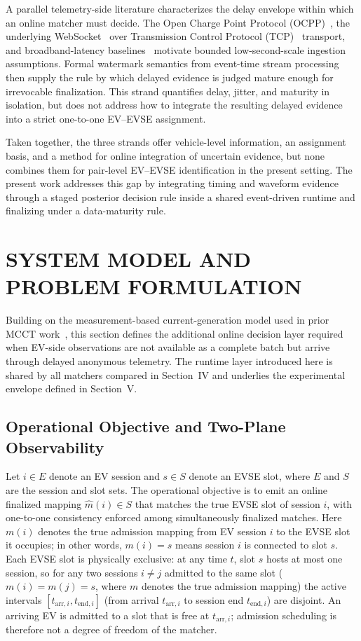 \documentclass{ieeeaccess}
\begin{document}
    A parallel telemetry-side literature characterizes the delay envelope within which an online matcher must decide.
    The Open Charge Point Protocol (OCPP)~\cite{b22}, the underlying WebSocket~\cite{b23} over Transmission Control Protocol (TCP)~\cite{b24} transport, and broadband-latency baselines~\cite{b25} motivate bounded low-second-scale ingestion assumptions.
    Formal watermark semantics from event-time stream processing~\cite{b26} then supply the rule by which delayed evidence is judged mature enough for irrevocable finalization.
    This strand quantifies delay, jitter, and maturity in isolation, but does not address how to integrate the resulting delayed evidence into a strict one-to-one EV--EVSE assignment.

    Taken together, the three strands offer vehicle-level information, an assignment basis, and a method for online integration of uncertain evidence, but none combines them for pair-level EV--EVSE identification in the present setting.
    The present work addresses this gap by integrating timing and waveform evidence through a staged posterior decision rule inside a shared event-driven runtime and finalizing under a data-maturity rule.

    \section{SYSTEM MODEL AND PROBLEM FORMULATION}

    Building on the measurement-based current-generation model used in prior MCCT work~\cite{b14}, this section defines the additional online decision layer required when EV-side observations are not available as a complete batch but arrive through delayed anonymous telemetry.
    The runtime layer introduced here is shared by all matchers compared in Section~IV and underlies the experimental envelope defined in Section~V.

    \subsection{Operational Objective and Two-Plane Observability}
    Let $i \in E$ denote an EV session and $s \in S$ denote an EVSE slot, where $E$ and $S$ are the session and slot sets.
    The operational objective is to emit an online finalized mapping $\hat{m}(i) \in S$ that matches the true EVSE slot of session $i$, with one-to-one consistency enforced among simultaneously finalized matches.
    Here $m(i)$ denotes the true admission mapping from EV session $i$ to the EVSE slot it occupies; in other words, $m(i)=s$ means session $i$ is connected to slot $s$.
    Each EVSE slot is physically exclusive: at any time $t$, slot $s$ hosts at most one session, so for any two sessions $i \neq j$ admitted to the same slot ($m(i) = m(j) = s$, where $m$ denotes the true admission mapping) the active intervals $[t_{\text{arr},i}, t_{\text{end},i}]$ (from arrival $t_{\text{arr},i}$ to session end $t_{\text{end},i}$) are disjoint.
    An arriving EV is admitted to a slot that is free at $t_{\text{arr},i}$; admission scheduling is therefore not a degree of freedom of the matcher.
\end{document}
